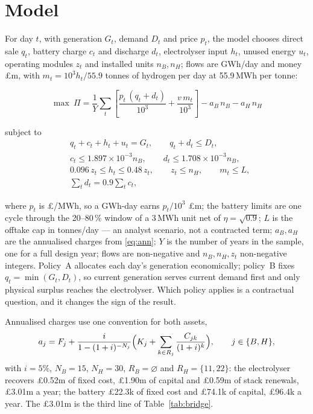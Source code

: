 \documentclass[11pt,a4paper]{article}
\begin{document}
\section{Model}

For day $t$, with generation $G_t$, demand $D_t$ and price $p_t$, the model chooses direct sale
$q_t$, battery charge $c_t$ and discharge $d_t$, electrolyser input $h_t$, unused energy $u_t$,
operating modules $z_t$ and installed units $n_B,n_H$; flows are GWh/day and money £m, with
$m_t=10^{3}h_t/55.9$ tonnes of hydrogen per day at 55.9\,MWh per tonne:

\begin{equation}
\max\ \Pi=\frac{1}{Y}\sum_{t}\left[\frac{p_t\,(q_t+d_t)}{10^{3}}+\frac{v\,m_t}{10^{3}}\right]
-a_B\,n_B-a_H\,n_H
\label{eq:obj}
\end{equation}

\noindent subject to
\begin{align}
&q_t+c_t+h_t+u_t = G_t, \qquad q_t+d_t \le D_t, \label{eq:bal}\\
&c_t \le 1.897{\times}10^{-3} n_B, \qquad d_t \le 1.708{\times}10^{-3} n_B, \label{eq:battcap}\\
&0.096\,z_t \le h_t \le 0.48\,z_t, \qquad z_t \le n_H, \qquad m_t \le L, \label{eq:cap}\\
&\textstyle\sum_t d_t = 0.9\sum_t c_t , \label{eq:batt}
\end{align}

\noindent where $p_t$ is £/MWh, so a GWh-day earns $p_t/10^{3}$ £m; the battery limits are one
cycle through the 20--80\,\% window of a 3\,MWh unit net of $\eta=\sqrt{0.9}$; $L$ is the offtake
cap in tonnes/day --- an analyst scenario, not a contracted term; $a_B,a_H$ are the annualised
charges from \eqref{eq:ann}; $Y$ is the number of years in the sample, one for a full design year;
flows are non-negative and $n_B,n_H,z_t$ non-negative integers.
Policy~A allocates each day's generation economically; policy~B fixes $q_t=\min(G_t,D_t)$, so
current generation serves current demand first and only physical surplus reaches the
electrolyser. Which policy applies is a contractual question, and it changes the sign of the
result.

Annualised charges use one convention for both assets,
\begin{equation}
a_j=F_j+\frac{i}{1-(1+i)^{-N_j}}\Bigl(K_j+\sum_{k\in R_j}\frac{C_{jk}}{(1+i)^{k}}\Bigr),
\qquad j\in\{B,H\},
\label{eq:ann}
\end{equation}
with $i=5\%$, $N_B=15$, $N_H=30$, $R_B=\varnothing$ and $R_H=\{11,22\}$: the electrolyser
recovers £0.52m of fixed cost, £1.90m of capital and £0.59m of stack renewals, £3.01m a year;
the battery £22.3k of fixed cost and £74.1k of capital, £96.4k a year. The £3.01m is the
third line of Table~\ref{tab:bridge}.
\end{document}
